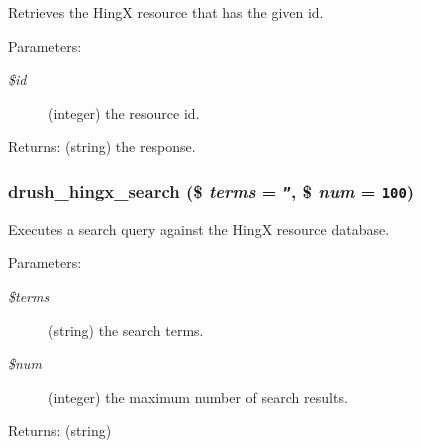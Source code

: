 Retrieves the Hing\-X resource that has the given id. 

\begin{Desc}
\item[Parameters:]
\begin{description}
\item[{\em \$id}](integer) the resource id. \end{description}
\end{Desc}
\begin{Desc}
\item[Returns:](string) the response. \end{Desc}
\subsubsection{\setlength{\rightskip}{0pt plus 5cm}drush\_\-hingx\_\-search (\$ {\em terms} = {\tt ''}, \$ {\em num} = {\tt 100})}\label{hingx_8drush_8inc_eb41cfcb23869e11c29362267ee47629}


Executes a search query against the Hing\-X resource database. 

\begin{Desc}
\item[Parameters:]
\begin{description}
\item[{\em \$terms}](string) the search terms. \item[{\em \$num}](integer) the maximum number of search results. \end{description}
\end{Desc}
\begin{Desc}
\item[Returns:](string) \end{Desc}
